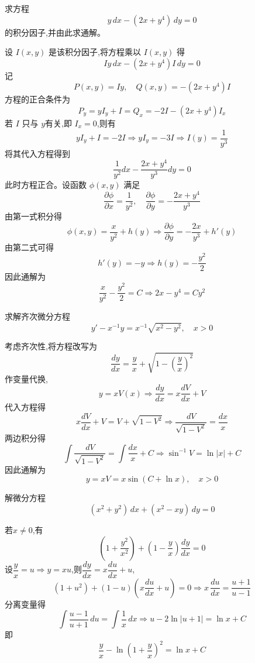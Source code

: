 \begin{questions}
    \question 求方程
    \[
    y\,dx - (2x + y^4)\,dy = 0
    \]
    的积分因子,并由此求通解。
    \begin{solution}
        设 $I(x, y)$ 是该积分因子,将方程乘以 $I(x, y)$ 得
        \[
        I y\,dx -(2x + y^4)I\,dy = 0
        \]
        记
        \[
        P(x,y) = Iy, \quad Q(x,y) = -(2x + y^4)I
        \]
        方程的正合条件为
        \[
        P_y = y I_y + I = Q_x = -2 I - (2x+y^4)I_x
        \]
        若 $I$ 只与 $y$有关,即 $I_x = 0$,则有
        \[
        y I_y + I = -2 I \Rightarrow y I_y = -3I \Rightarrow I(y) = \frac{1}{y^3}
        \]
        将其代入方程得到
        \[
        \frac{1}{y^2}dx - \frac{2x + y^4}{y^3}dy = 0
        \]
        此时方程正合。设函数 $\phi(x,y)$ 满足
        \[
        \frac{\partial \phi}{\partial x} = \frac{1}{y^2}, \quad 
        \frac{\partial \phi}{\partial y} = -\frac{2x + y^4}{y^3}
        \]
        由第一式积分得
        \[
        \phi(x,y) = \frac{x}{y^2} + h(y) \Rightarrow \frac{\partial \phi}{\partial y} = -\frac{2x}{y^3} + h'(y)
        \]
        由第二式可得
        \[
        h'(y) = -y \Rightarrow h(y) = -\frac{y^2}{2}
        \]
        因此通解为
        \[
        \frac{x}{y^2} - \frac{y^2}{2} = C \Rightarrow 2x - y^4 = C y^2
        \]
    \end{solution}

    \question 求解齐次微分方程
    \[
    y' - x^{-1}y = x^{-1}\sqrt{x^2 - y^2}, \quad x > 0
    \]
    \begin{solution}
        考虑齐次性,将方程改写为
        \[
        \frac{dy}{dx} = \frac{y}{x} + \sqrt{1 - \left(\frac{y}{x}\right)^2}
        \]
        作变量代换,
        \[
        y = xV(x) \Rightarrow \frac{dy}{dx} = x\frac{dV}{dx} + V
        \]
        代入方程得
        \[
        x\frac{dV}{dx} + V = V + \sqrt{1-V^2} \Rightarrow \frac{dV}{\sqrt{1-V^2}} = \frac{dx}{x}
        \]
        两边积分得
        \[
        \int \frac{dV}{\sqrt{1-V^2}} = \int \frac{dx}{x} + C \Rightarrow \sin^{-1} V = \ln|x| + C
        \]
        因此通解为
        \[
        y = xV = x \sin(C + \ln x), \quad x > 0
        \]
    \end{solution}

    \question 解微分方程
    \[
    (x^2 + y^2)\,dx + (x^2 - xy)\,dy = 0
    \]
    \begin{solution}
        若$x \neq 0$,有
        \[
        \left(1 + \frac{y^2}{x^2}\right) + \left(1 - \frac{y}{x}\right) \frac{dy}{dx} = 0
        \]
        设$\dfrac{y}{x} = u \Rightarrow y = xu$,则$\dfrac{dy}{dx} = x \dfrac{du}{dx} + u$,
        \[
        (1 + u^2) + (1 - u)\left(x \frac{du}{dx} + u\right) = 0 \Rightarrow x \,\frac{du}{dx}=\frac{u+1}{u-1}
        \]
        分离变量得
        \[
        \int \frac{u-1}{u+1}\, du = \int \frac{1}{x}\, dx \Rightarrow u - 2 \ln |u+1| = \ln x + C 
        \]
        即
        \[
        \frac{y}{x} - \ln \left(1 + \frac{y}{x}\right)^2 = \ln x + C
        \]
    \end{solution}


\end{questions}
